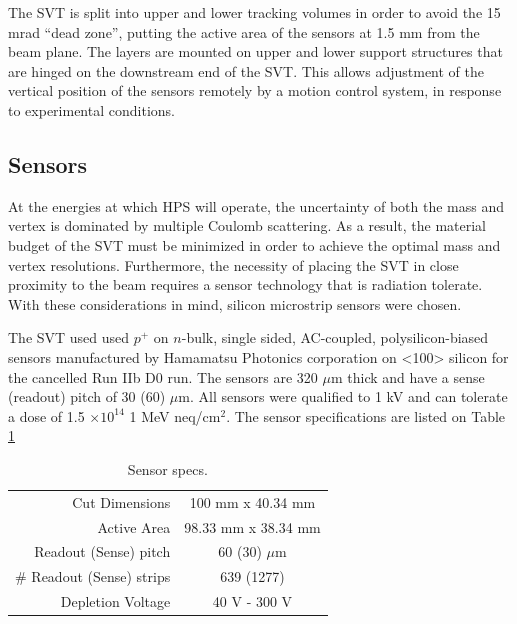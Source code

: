 The SVT is split into upper and lower tracking volumes in order to avoid
the 15 mrad ``dead zone'', putting the active area of the sensors at 1.5 mm
from the beam plane.  The layers are mounted on upper and lower support 
structures that are hinged on the downstream end of the SVT.  This allows
adjustment of the vertical position of the sensors remotely by a motion
control system, in response to experimental conditions.

\subsection*{Sensors}

At the energies at which HPS will operate, the uncertainty of both the mass and
vertex is dominated by multiple Coulomb scattering.  As a result, 
the material budget of the SVT must be minimized in order to achieve the 
optimal mass and vertex resolutions.  Furthermore, the necessity of placing the
SVT in close proximity to the beam requires a sensor technology that is 
radiation tolerate.  With these considerations in mind, silicon microstrip 
sensors were chosen.

The SVT used used $p^{+}$ on $n$-bulk, single sided, AC-coupled, 
polysilicon-biased sensors manufactured by Hamamatsu Photonics
corporation on <100> silicon for the cancelled Run IIb D0 run.
The sensors are 320 $\mu$m thick and have 
a sense (readout) pitch of 30 (60) $\mu$m. All sensors were qualified to 
1 kV and can tolerate a dose of 1.5 $\times 10^{14}$ 1 MeV neq/cm$^{2}$.  The 
sensor specifications are listed on Table \ref{tab:sensor_specs}

\begin{table}[t]
    \begin{center}
        \begin{tabular}{rc}
            Cut Dimensions & 100 mm x 40.34 mm \\
            Active Area & 98.33 mm x 38.34 mm \\
            Readout (Sense) pitch & 60 (30) $\mu$m \\
            # Readout (Sense) strips & 639 (1277) \\
            Depletion Voltage & 40 V - 300 V \\
        \end{tabular}
        \caption{Sensor specs.}
        \label{tab:sensor_specs}
    \end{center}
\end{table}

